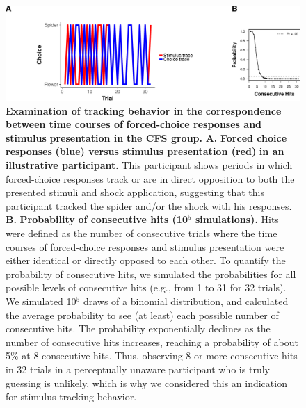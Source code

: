 \documentclass[12pt]{article}
\begin{document}
\begin{figure}[htbp]
\centering
\includegraphics[width=1.0\textwidth]{cfs_sub_binomsim-crop.pdf}
\caption{\label{fig:orge0dadc6}
\textbf{Examination of tracking behavior in the} \textbf{correspondence between time courses of} \textbf{forced-choice responses and stimulus} \textbf{presentation in} \textbf{the CFS group.} \textbf{A.} \textbf{Forced choice responses} \textbf{(blue) versus stimulus presentation (red)} \textbf{in an illustrative participant.} This participant shows periods in which forced-choice responses track or are in direct opposition to both the presented stimuli and shock application, suggesting that this participant tracked the spider and/or the shock with his responses. \textbf{B.} \textbf{Probability} \textbf{of consecutive hits (10\(^{\text{5}}\) simulations).} Hits were defined as the number of consecutive trials where the time courses of forced-choice responses and stimulus presentation were either identical or directly opposed to each other. To quantify the probability of consecutive hits, we simulated the probabilities for all possible levels of consecutive hits (e.g., from 1 to 31 for 32 trials). We simulated 10\(^{\text{5}}\) draws of a binomial distribution, and calculated the average probability to see (at least) each possible number of consecutive hits. The probability exponentially declines as the number of consecutive hits increases, reaching a probability of about 5\% at 8 consecutive hits. Thus, observing 8 or more consecutive hits in 32 trials in a perceptually unaware participant who is truly guessing is unlikely, which is why we considered this an indication for stimulus tracking behavior.}
\end{figure}

\clearpage
\end{document}
